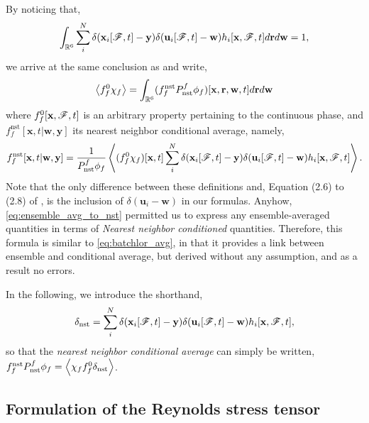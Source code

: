 By noticing that, 
\begin{equation}
    \int_{\mathbb{R}^6}
    \sum_i^N 
    \delta(\textbf{x}_i[\mathscr{F},t]-\textbf{y})
    \delta(\textbf{u}_i[\mathscr{F},t]-\textbf{w})
    h_i[\textbf{x},\mathscr{F},t]
    d\textbf{r}
    d\textbf{w} 
    =1,
\end{equation}
we arrive at the same conclusion as \citet{zhang2021ensemble} and write, 
\begin{equation}
    \avg{f_f^0\chi_f}
    = 
    \int_{\mathbb{R}^6}
    (f_f^\text{nst}P_\text{nst}^f\phi_f)[\textbf{x},\textbf{r},\textbf{w},t]
    d\textbf{r}
    d\textbf{w}
    \label{eq:ensemble_avg_to_nst}
\end{equation} 
where $f_f^0[\textbf{x},\mathscr{F},t]$ is an arbitrary property pertaining to the continuous phase, and $f_f^\text{nst}[\textbf{x},t|\textbf{w},\textbf{y}]$ its nearest neighbor conditional average, namely, 
\begin{equation}
    f_f^\text{nst}[\textbf{x},t|\textbf{w},\textbf{y}]
    =\frac{1}{P_\text{nst}^f\phi_f}
    \avg{
        (f_f^0
        \chi_f)[\textbf{x},t]
        \sum_i^N 
        \delta(\textbf{x}_i[\FF,t]-\textbf{y})
        \delta(\textbf{u}_i[\FF,t]-\textbf{w})
        h_i[\textbf{x},\FF,t]
    }.
    \label{eq:def_f_nst}
\end{equation}
Note that the only difference between these definitions and, Equation (2.6) to (2.8) of \citet{zhang2021ensemble}, is the inclusion of $\delta(\textbf{u}_i - \textbf{w})$ in our formulas. 
Anyhow, \ref{eq:ensemble_avg_to_nst} permitted us to express any ensemble-averaged quantities in terms of \textit{Nearest neighbor conditioned} quantities. 
Therefore, this formula is similar to \ref{eq:batchlor_avg}, in that it provides a link between ensemble and conditional average, but derived without any assumption, and as a result no errors. 

In the following, we introduce the shorthand, 
\begin{equation*}
    \delta_\text{nst}
    =
    \sum_i^N 
    \delta(\textbf{x}_i[\FF,t]-\textbf{y})
    \delta(\textbf{u}_i[\FF,t]-\textbf{w})
    h_i[\textbf{x},\FF,t],
    \label{eq:def_delta_nst}
\end{equation*}
so that the \textit{nearest neighbor  conditional  average} can simply be written, $f_f^\text{nst} P_\text{nst}^f \phi_f = \left<\chi_f f_f^0 \delta_\text{nst}\right>$.

\subsection{Formulation of the Reynolds stress tensor}

